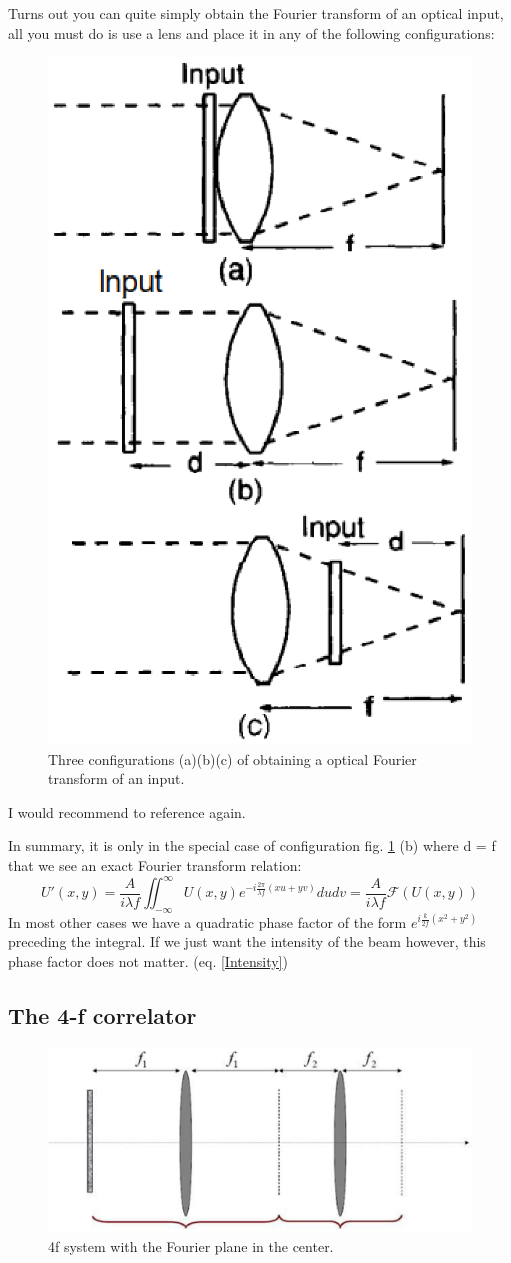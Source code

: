 \documentclass{article}
\begin{document}
Turns out you can quite simply obtain the Fourier transform of an optical input, all you must do is use a lens and place it in any of the following configurations:

\begin{figure}[!phbt]
    \centering
    \includegraphics[width=0.4\linewidth]{img/fouriertrans.eps}
    \caption{Three configurations (a)(b)(c) of obtaining a optical Fourier transform of an input.}
    \label{fig:fouriertrans}
\end{figure}

I would recommend to reference \cite{fourier} again.

In summary, it is only in the special case of configuration fig. \ref{fig:fouriertrans} (b) where d = f that we see an exact Fourier transform relation:
\begin{equation}
U'(x,y) = \frac{A}{i\lambda f} \iint_{-\infty}^{\infty} U(x,y) e^{-i\frac{2\pi}{\lambda f}(xu+yv)} dudv = \frac{A}{i\lambda f} \mathcal{F}(U(x,y))
\end{equation}
In most other cases we have a quadratic phase factor of the form $e^{i\frac{k}{2f}(x^2+y^2)}$ preceding the integral. If we just want the intensity of the beam however, this phase factor does not matter. (eq. \ref{Intensity})

\pagebreak

\subsection{The 4-f correlator}

\begin{figure}[!phbt]
    \centering
    \includegraphics[width=0.6\linewidth]{img/4f_correlator.eps}
    \caption{4f system with the Fourier plane in the center.}
    \label{fig:4f_correlator}
\end{figure}
\end{document}
